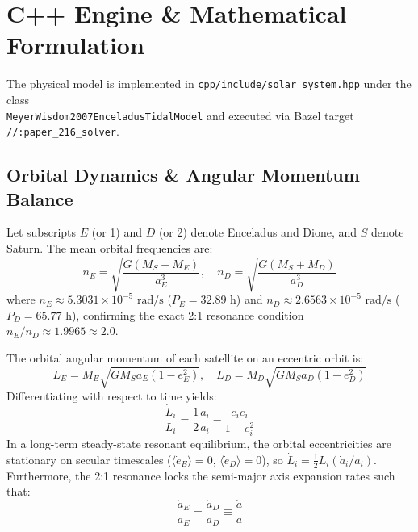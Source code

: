 \documentclass[11pt,a4paper]{article}
\begin{document}
\section{C++ Engine \& Mathematical Formulation}
The physical model is implemented in \texttt{cpp/include/solar\_system.hpp} under the class \\ \texttt{MeyerWisdom2007EnceladusTidalModel} and executed via Bazel target \texttt{//:paper\_216\_solver}.

\subsection{Orbital Dynamics \& Angular Momentum Balance}
Let subscripts $E$ (or 1) and $D$ (or 2) denote Enceladus and Dione, and $S$ denote Saturn. The mean orbital frequencies are:
\begin{equation}
n_E = \sqrt{\frac{G(M_S + M_E)}{a_E^3}}, \quad n_D = \sqrt{\frac{G(M_S + M_D)}{a_D^3}}
\end{equation}
where $n_E \approx 5.3031 \times 10^{-5}\text{ rad/s}$ ($P_E = 32.89\text{ h}$) and $n_D \approx 2.6563 \times 10^{-5}\text{ rad/s}$ ($P_D = 65.77\text{ h}$), confirming the exact 2:1 resonance condition $n_E / n_D \approx 1.9965 \approx 2.0$.

The orbital angular momentum of each satellite on an eccentric orbit is:
\begin{equation}
L_E = M_E \sqrt{G M_S a_E (1 - e_E^2)}, \quad L_D = M_D \sqrt{G M_S a_D (1 - e_D^2)}
\end{equation}
Differentiating with respect to time yields:
\begin{equation}
\frac{\dot{L}_i}{L_i} = \frac{1}{2}\frac{\dot{a}_i}{a_i} - \frac{e_i \dot{e}_i}{1 - e_i^2}
\end{equation}
In a long-term steady-state resonant equilibrium, the orbital eccentricities are stationary on secular timescales ($\langle \dot{e}_E \rangle = 0$, $\langle \dot{e}_D \rangle = 0$), so $\dot{L}_i = \frac{1}{2} L_i (\dot{a}_i / a_i)$. Furthermore, the 2:1 resonance locks the semi-major axis expansion rates such that:
\begin{equation}
\frac{\dot{a}_E}{a_E} = \frac{\dot{a}_D}{a_D} \equiv \frac{\dot{a}}{a}
\end{equation}
\end{document}
